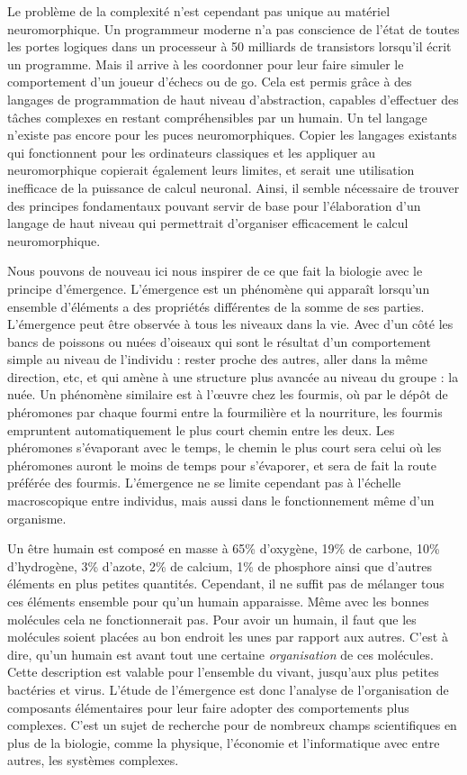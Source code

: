 	Le problème de la complexité n'est cependant pas unique au matériel neuromorphique. Un programmeur moderne n'a pas conscience de l'état de toutes les portes logiques dans un processeur à 50 milliards de transistors lorsqu'il écrit un programme. Mais il arrive à les coordonner pour leur faire simuler le comportement d'un joueur d'échecs ou de go. Cela est permis grâce à des langages de programmation de haut niveau d'abstraction, capables d'effectuer des tâches complexes en restant compréhensibles par un humain. Un tel langage n'existe pas encore pour les puces neuromorphiques. Copier les langages existants qui fonctionnent pour les ordinateurs classiques et les appliquer au neuromorphique copierait également leurs limites, et serait une utilisation inefficace de la puissance de calcul neuronal. Ainsi, il semble nécessaire de trouver des principes fondamentaux pouvant servir de base pour l'élaboration d'un langage de haut niveau qui permettrait d'organiser efficacement le calcul neuromorphique.

	Nous pouvons de nouveau ici nous inspirer de ce que fait la biologie avec le principe d'émergence. L'émergence est un phénomène qui apparaît lorsqu'un ensemble d'éléments a des propriétés différentes de la somme de ses parties. L'émergence peut être observée à tous les niveaux dans la vie. Avec d'un côté les bancs de poissons ou nuées d'oiseaux qui sont le résultat d'un comportement simple au niveau de l'individu : rester proche des autres, aller dans la même direction, etc, et qui amène à une structure plus avancée au niveau du groupe : la nuée. Un phénomène similaire est à l'œuvre chez les fourmis, où par le dépôt de phéromones par chaque fourmi entre la fourmilière et la nourriture, les fourmis empruntent automatiquement le plus court chemin entre les deux. Les phéromones s'évaporant avec le temps, le chemin le plus court sera celui où les phéromones auront le moins de temps pour s'évaporer, et sera de fait la route préférée des fourmis. L'émergence ne se limite cependant pas à l'échelle macroscopique entre individus, mais aussi dans le fonctionnement même d'un organisme.

	Un être humain est composé en masse à 65\% d'oxygène, 19\% de carbone, 10\% d'hydrogène, 3\% d'azote, 2\% de calcium, 1\% de phosphore ainsi que d'autres éléments en plus petites quantités. Cependant, il ne suffit pas de mélanger tous ces éléments ensemble pour qu'un humain apparaisse. Même avec les bonnes molécules cela ne fonctionnerait pas. Pour avoir un humain, il faut que les molécules soient placées au bon endroit les unes par rapport aux autres. C'est à dire, qu'un humain est avant tout une certaine \textit{organisation} de ces molécules. Cette description est valable pour l'ensemble du vivant, jusqu'aux plus petites bactéries et virus. L'étude de l'émergence est donc l'analyse de l'organisation de composants élémentaires pour leur faire adopter des comportements plus complexes. C'est un sujet de recherche pour de nombreux champs scientifiques en plus de la biologie, comme la physique, l'économie et l'informatique avec entre autres, les systèmes complexes.

